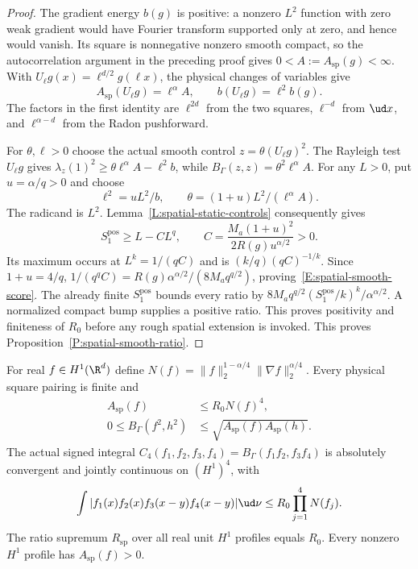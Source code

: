 \begin{proof}
  The gradient energy $b(g)$ is positive: a nonzero $L^2$ function
  with zero weak gradient would have Fourier transform supported
  only at zero, and hence would vanish.
  Its square is nonnegative nonzero smooth compact, so the
  autocorrelation argument in the preceding proof gives
  $0<A:=A_{\mathrm{sp}}(g)<\infty$.
  With $U_\ell g(x)=\ell^{d/2}g(\ell x)$, the physical changes
  of variables give
  \begin{equation}\label{E:spatial-dilation}
    A_{\mathrm{sp}}(U_\ell g)=\ell^\alpha A,\qquad
    b(U_\ell g)=\ell^2b(g).
  \end{equation}
  The factors in the first identity are $\ell^{2d}$ from
  the two squares, $\ell^{-d}$ from $\ud x$, and
  $\ell^{\alpha-d}$ from the Radon pushforward.

  For $\theta,\ell>0$ choose the actual smooth control
  $z=\theta(U_\ell g)^2$.
  The Rayleigh test $U_\ell g$ gives
  $\lambda_z(1)^2\ge\theta\ell^\alpha A-\ell^2b$,
  while $B_\Gamma(z,z)=\theta^2\ell^\alpha A$.
  For any $L>0$, put $u=\alpha/q>0$ and choose
  \[
    \ell^2=uL^2/b,\qquad
    \theta=(1+u)L^2/(\ell^\alpha A).
  \]
  The radicand is $L^2$. Lemma~\ref{L:spatial-static-controls}
  consequently gives
  \[
    S_1^{\mathrm{pos}}\ge L-CL^q,\qquad
    C=\frac{M_a(1+u)^2}{2R(g)u^{\alpha/2}}>0.
  \]
  Its maximum occurs at $L^k=1/(qC)$ and is
  $(k/q)(qC)^{-1/k}$.
  Since $1+u=4/q$,
  $1/(q^qC)=R(g)\alpha^{\alpha/2}/(8M_aq^{q/2})$,
  proving~\eqref{E:spatial-smooth-score}.
  The already finite $S_1^{\mathrm{pos}}$ bounds every ratio by
  $8M_aq^{q/2}(S_1^{\mathrm{pos}}/k)^k/\alpha^{\alpha/2}$.
  A normalized compact bump supplies a positive ratio.
  This proves positivity and finiteness of $R_0$ before any
  rough spatial extension is invoked.
  This proves Proposition~\ref{P:spatial-smooth-ratio}.
\end{proof}

\begin{proposition}
  \label{P:spatial-four-linear}
  For real $f\in H^1(\R^d)$ define
  $N(f)=\|f\|_2^{1-\alpha/4}\|\nabla f\|_2^{\alpha/4}$.
  Every physical square pairing is finite and
  \begin{align}
    A_{\mathrm{sp}}(f)&\le R_0N(f)^4,\label{E:spatial-homogeneous-bound}\\
    0\le B_\Gamma(f^2,h^2)
    &\le\sqrt{A_{\mathrm{sp}}(f)A_{\mathrm{sp}}(h)}.
    \label{E:spatial-square-CS}
  \end{align}
  The actual signed integral
  $C_4(f_1,f_2,f_3,f_4)=B_\Gamma(f_1f_2,f_3f_4)$ is
  absolutely convergent and jointly continuous on $(H^1)^4$, with
  \begin{equation}\label{E:spatial-four-linear}
    \int|f_1(x)f_2(x)f_3(x-y)f_4(x-y)|\ud\nu
    \le R_0\prod_{j=1}^4N(f_j).
  \end{equation}
  The ratio supremum $R_{\mathrm{sp}}$ over all real unit $H^1$
  profiles equals $R_0$. Every nonzero $H^1$ profile has
  $A_{\mathrm{sp}}(f)>0$.
\end{proposition}

